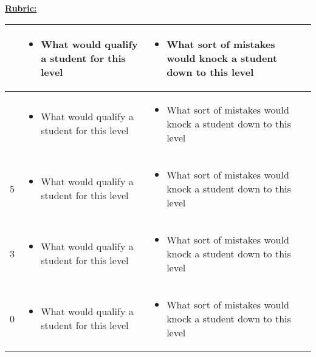 \underline{\textbf{Rubric:}}
\begin{center}
\begin{tabularx}{6.2in}{ |>{\centering\arraybackslash} p{0.1in}|p{2.58in}|p{3in}| }
  \hline
  7 
  & \parbox[c]{\hsize}
  {
    \begin{itemize}
        \item What would qualify a student for this level
    \end{itemize}
  }
  & \parbox[c]{\hsize}
  {
    \begin{itemize}
        \item What sort of mistakes would knock a student down to this level
    \end{itemize}
  }\\ \hline
  6 
  & \parbox[c]{\hsize}
  {
    \begin{itemize}
        \item What would qualify a student for this level
    \end{itemize}
  }
  & \parbox[c]{\hsize}
  {
    \begin{itemize}
        \item What sort of mistakes would knock a student down to this level
    \end{itemize}
  }\\ \hline
  5 
  & \parbox[c]{\hsize}
  {
    \begin{itemize}
        \item What would qualify a student for this level
    \end{itemize}
  }
  & \parbox[c]{\hsize}
  {
    \begin{itemize}
        \item What sort of mistakes would knock a student down to this level
    \end{itemize}
  }\\ \hline
  3 
  & \parbox[c]{\hsize}
  {
    \begin{itemize}
        \item What would qualify a student for this level
    \end{itemize}
  }
  & \parbox[c]{\hsize}
  {
    \begin{itemize}
        \item What sort of mistakes would knock a student down to this level
    \end{itemize}
  }\\ \hline
  0 
  & \parbox[c]{\hsize}
  {
    \begin{itemize}
        \item What would qualify a student for this level
    \end{itemize}
  }
  & \parbox[c]{\hsize}
  {
    \begin{itemize}
        \item What sort of mistakes would knock a student down to this level
    \end{itemize}
  }\\ \hline
\end{tabularx}
\end{center}
